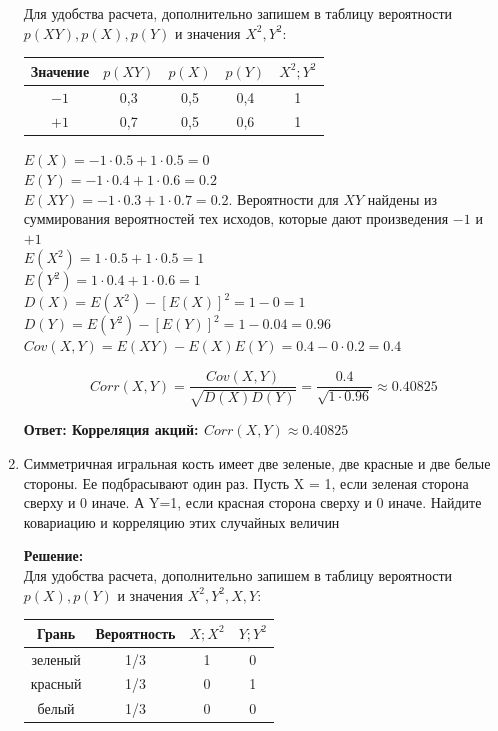 \documentclass[a4paper,12pt]{article}
\begin{document}
\begin{enumerate}
Для удобства расчета, дополнительно запишем в таблицу вероятности $p(XY), p(X), p(Y)$ и значения $X^2, Y^2$:

\begin{center}
 \begin{tabular}{|c|c|c| c| c |} 
 \hline
 Значение & $p(XY)$& $p(X)$& $p(Y)$&$X^2; Y^2$ \\ [0.5ex] 
 \hline
 $-1$ & 0,3 & 0,5&0,4&1 \\ 
 \hline
 $+1$ & 0,7	 & 0,5&0,6&1  \\ 
 \hline
\end{tabular}
\end{center}
$E(X) = -1 \cdot 0.5 + 1\cdot 0.5=0$\\
$E(Y) = -1 \cdot 0.4 + 1\cdot 0.6=0.2$\\
$E(XY) = -1 \cdot 0.3 + 1\cdot 0.7=0.2$. Вероятности для $XY$ найдены из суммирования вероятностей тех исходов, которые дают произведения $-1$ и $+1$\\
$E(X^2) = 1 \cdot 0.5 + 1\cdot 0.5=1$\\
$E(Y^2) = 1 \cdot 0.4 + 1\cdot 0.6=1$\\

$D(X) = E(X^2)- [E(X)]^2=1-0 = 1$\\
$D(Y) = E(Y^2)- [E(Y)]^2=1-0.04 = 0.96$\\
$Cov(X,Y)=E(XY)-E(X)E(Y)=0.4-0\cdot0.2=0.4$

$$Corr(X,Y) = \frac{Cov(X,Y)}{\sqrt{D(X)D(Y)}}=\frac{0.4}{\sqrt{1\cdot0.96}}\approx 0.40825$$

\textbf{Ответ: Корреляция акций: $Corr(X,Y)\approx 0.40825$} 



\item	Симметричная игральная кость имеет две зеленые, две красные и две белые стороны. Ее подбрасывают один раз. Пусть X = 1, если зеленая сторона сверху и 0 иначе. А Y=1, если красная сторона сверху и 0 иначе. Найдите ковариацию и корреляцию этих случайных величин

\textbf{Решение:}\\
Для удобства расчета, дополнительно запишем в таблицу вероятности $p(X), p(Y)$ и значения $X^2, Y^2, X, Y$:

\begin{center}
 \begin{tabular}{|c|c|c| c| } 
 \hline
 Грань & Вероятность& $X; X^2$& $Y; Y^2$ \\ [0.5ex] 
 \hline
 зеленый & 1/3 & 1&0 \\ 
 \hline
 красный & 1/3	 & 0&1  \\ 
 \hline
 белый& 1/3	 & 0&0  \\ 
 \hline
\end{tabular}
\end{center}


\end{enumerate}
\end{document}
